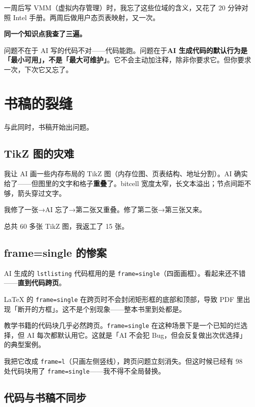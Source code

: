 一周后写 VMM（虚拟内存管理）时，我忘了这些位域的含义，又花了 20 分钟对照 Intel 手册。两周后做用户态页表映射，又一次。

\textbf{同一个知识点我查了三遍。}

问题不在于 AI 写的代码不对——代码能跑。问题在于\textbf{AI 生成代码的默认行为是「最小可用」，不是「最大可维护」}。它不会主动加注释，除非你要求它。但你要求一次，下次它又忘了。

\section{书稿的裂缝}

与此同时，书稿开始出问题。

\subsection{TikZ 图的灾难}

我让 AI 画一些内存布局的 TikZ 图（内存位图、页表结构、地址分割）。AI 确实给了——但图里的文字和格子\textbf{重叠}了。bitcell 宽度太窄，长文本溢出；节点间距不够，箭头穿过文字。

我修了一张→AI 忘了→第二张又重叠。修了第二张→第三张又来。

总共 60 多张 TikZ 图，我返工了 15 张。

\subsection{frame=single 的惨案}

AI 生成的 \texttt{lstlisting} 代码框用的是 \texttt{frame=single}（四面画框）。看起来还不错——\textbf{直到代码跨页}。

LaTeX 的 \texttt{frame=single} 在跨页时不会封闭矩形框的底部和顶部，导致 PDF 里出现「断开的方框」。这不是个别现象——整本书里到处都是。

\begin{pitfallbox}
教学书籍的代码块几乎必然跨页。\texttt{frame=single} 在这种场景下是一个已知的烂选择，但 AI 每次都默认用它。这就是「AI 不会犯 Bug，但会反复做出次优选择」的典型案例。
\end{pitfallbox}

我把它改成 \texttt{frame=l}（只画左侧竖线），跨页问题立刻消失。但这时候已经有 98 处代码块用了 \texttt{frame=single}——我不得不全局替换。

\subsection{代码与书稿不同步}

